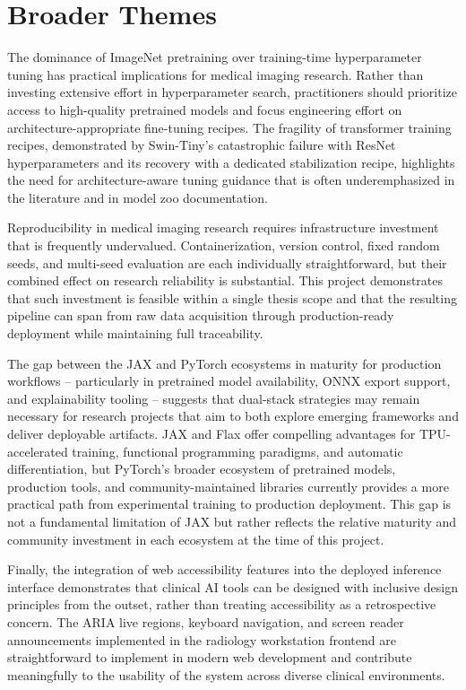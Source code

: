\documentclass[justified,notoc,openany]{tufte-book}
\begin{document}
\section{Broader Themes}\label{broader-themes}

The dominance of ImageNet pretraining over training-time hyperparameter tuning has practical implications for medical imaging research. Rather than investing extensive effort in hyperparameter search, practitioners should prioritize access to high-quality pretrained models and focus engineering effort on architecture-appropriate fine-tuning recipes. The fragility of transformer training recipes, demonstrated by Swin-Tiny's catastrophic failure with ResNet hyperparameters and its recovery with a dedicated stabilization recipe, highlights the need for architecture-aware tuning guidance that is often underemphasized in the literature and in model zoo documentation.

Reproducibility in medical imaging research requires infrastructure investment that is frequently undervalued. Containerization, version control, fixed random seeds, and multi-seed evaluation are each individually straightforward, but their combined effect on research reliability is substantial. This project demonstrates that such investment is feasible within a single thesis scope and that the resulting pipeline can span from raw data acquisition through production-ready deployment while maintaining full traceability.

The gap between the JAX and PyTorch ecosystems in maturity for production workflows -- particularly in pretrained model availability, ONNX export support, and explainability tooling -- suggests that dual-stack strategies may remain necessary for research projects that aim to both explore emerging frameworks and deliver deployable artifacts. JAX and Flax offer compelling advantages for TPU-accelerated training, functional programming paradigms, and automatic differentiation, but PyTorch's broader ecosystem of pretrained models, production tools, and community-maintained libraries currently provides a more practical path from experimental training to production deployment. This gap is not a fundamental limitation of JAX but rather reflects the relative maturity and community investment in each ecosystem at the time of this project.

Finally, the integration of web accessibility features into the deployed inference interface demonstrates that clinical AI tools can be designed with inclusive design principles from the outset, rather than treating accessibility as a retrospective concern. The ARIA live regions, keyboard navigation, and screen reader announcements implemented in the radiology workstation frontend are straightforward to implement in modern web development and contribute meaningfully to the usability of the system across diverse clinical environments.
\end{document}
